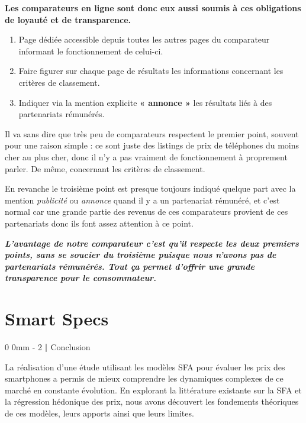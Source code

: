 \documentclass[
  12pt,
]{report}
\makeatletter
\renewcommand{\chapter}{%
    \clearpage %
    \@startsection{chapter}%
    {0} %
    {0mm} %
    {-\baselineskip} %
    {2\baselineskip} %
    {\normalfont\Huge\bfseries | \Huge\bfseries}%
}
\makeatother
\begin{document}
\textbf{Les comparateurs en ligne sont donc eux aussi soumis à ces
obligations de loyauté et de transparence.}

\begin{enumerate}
\def\labelenumi{\arabic{enumi}.}
\item
  Page dédiée accessible depuis toutes les autres pages du comparateur
  informant le fonctionnement de celui-ci.
\item
  Faire figurer sur chaque page de résultats les informations concernant
  les critères de classement.
\item
  Indiquer via la mention explicite \textbf{« annonce »} les résultats
  liés à des partenariats rémunérés.
\end{enumerate}

Il va sans dire que très peu de comparateurs respectent le premier
point, souvent pour une raison simple : ce sont juste des listings de
prix de téléphones du moins cher au plus cher, donc il n'y a pas
vraiment de fonctionnement à proprement parler. De même, concernant les
critères de classement.

En revanche le troisième point est presque toujours indiqué quelque part
avec la mention \emph{publicité} ou \emph{annonce} quand il y a un
partenariat rémunéré, et c'est normal car une grande partie des revenus
de ces comparateurs provient de ces partenariats donc ils font assez
attention à ce point.

\textbf{\emph{L'avantage de notre comparateur c'est qu'il respecte les
deux premiers points, sans se soucier du troisième puisque nous n'avons
pas de partenariats rémunérés. Tout ça permet d'offrir une grande
transparence pour le consommateur.}}

\section{Smart Specs}\label{smart-specs}

\chapter{Conclusion}\label{conclusion-2}

La réalisation d'une étude utilisant les modèles SFA pour évaluer les
prix des smartphones a permis de mieux comprendre les dynamiques
complexes de ce marché en constante évolution. En explorant la
littérature existante sur la SFA et la régression hédonique des prix,
nous avons découvert les fondements théoriques de ces modèles, leurs
apports ainsi que leurs limites.
\end{document}
